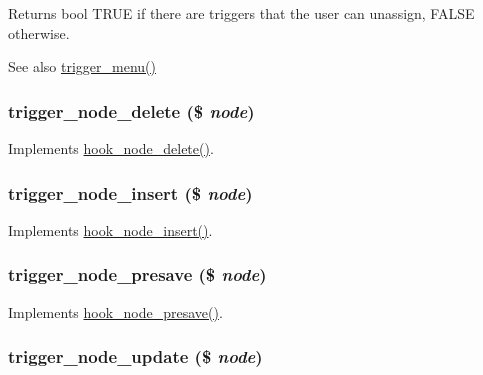 \begin{DoxyReturn}{Returns}
bool TRUE if there are triggers that the user can unassign, FALSE otherwise.
\end{DoxyReturn}
\begin{DoxySeeAlso}{See also}
\hyperlink{trigger_8module_a467708b4dec3a4e2c9eba80d0c94db3c}{trigger\_\-menu()} 
\end{DoxySeeAlso}
\hypertarget{trigger_8module_ab9c30dd53453d770edb48f06cc447c6b}{
\subsubsection[{trigger\_\-node\_\-delete}]{\setlength{\rightskip}{0pt plus 5cm}trigger\_\-node\_\-delete (\$ {\em node})}}
\label{trigger_8module_ab9c30dd53453d770edb48f06cc447c6b}
Implements \hyperlink{group__node__api__hooks_ga66ea0473a9950dc961802e801e5042e9}{hook\_\-node\_\-delete()}. \hypertarget{trigger_8module_acbb2d25f3861049eb771a7304afe724d}{
\subsubsection[{trigger\_\-node\_\-insert}]{\setlength{\rightskip}{0pt plus 5cm}trigger\_\-node\_\-insert (\$ {\em node})}}
\label{trigger_8module_acbb2d25f3861049eb771a7304afe724d}
Implements \hyperlink{group__node__api__hooks_ga8b40dc62e46e5055c205d2a723dc3548}{hook\_\-node\_\-insert()}. \hypertarget{trigger_8module_ab02151afb007d36dcb3ee42a28f12c40}{
\subsubsection[{trigger\_\-node\_\-presave}]{\setlength{\rightskip}{0pt plus 5cm}trigger\_\-node\_\-presave (\$ {\em node})}}
\label{trigger_8module_ab02151afb007d36dcb3ee42a28f12c40}
Implements \hyperlink{group__node__api__hooks_gab339b1a1ce0e235d4a9c5a05e410dcd6}{hook\_\-node\_\-presave()}. \hypertarget{trigger_8module_ae3af93566b42368b4033496742b97027}{
\subsubsection[{trigger\_\-node\_\-update}]{\setlength{\rightskip}{0pt plus 5cm}trigger\_\-node\_\-update (\$ {\em node})}}
